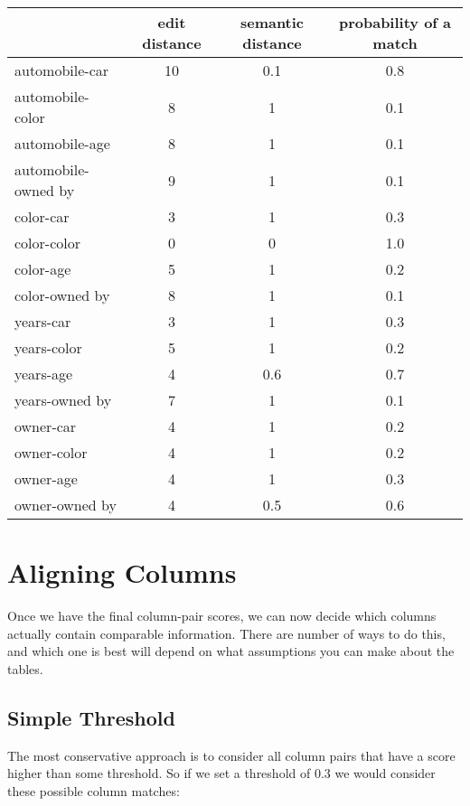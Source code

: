 \documentclass{datamade}
\theoremstyle{definition}
\theoremstyle{remark}
\begin{document}
\begin{center}
\begin{tabular}{|l|c|c|c|}
  \hline
  & edit distance & semantic distance & \textbf{probability of a match} \\\hline
  automobile-car & 10 & 0.1 & 0.8 \\\hline
  automobile-color & 8 & 1 & 0.1 \\\hline
  automobile-age & 8 & 1 & 0.1 \\\hline
  automobile-owned by & 9 & 1 & 0.1 \\\hline
  color-car & 3 & 1 & 0.3 \\\hline
  color-color & 0 & 0 & 1.0 \\\hline
  color-age & 5 & 1 & 0.2 \\\hline
  color-owned by & 8 & 1 & 0.1\\\hline
  years-car & 3 & 1 & 0.3 \\\hline
  years-color & 5 & 1 & 0.2 \\\hline
  years-age & 4 & 0.6 & 0.7 \\\hline
  years-owned by & 7 & 1 & 0.1 \\\hline
  owner-car & 4 & 1 & 0.2 \\\hline
  owner-color & 4 & 1 & 0.2 \\\hline
  owner-age & 4 & 1 & 0.3 \\\hline
  owner-owned by & 4 & 0.5 & 0.6 \\\hline
\end{tabular}
\end{center}

\section{Aligning Columns}
Once we have the final column-pair scores, we can now decide which
columns actually contain comparable information. There are number of
ways to do this, and which one is best will depend on what assumptions
you can make about the tables.

\subsection*{Simple Threshold}
The most conservative approach is to consider all column pairs that
have a score higher than some threshold. So if we set a threshold of
$0.3$ we would consider these possible column matches:
\end{document}
